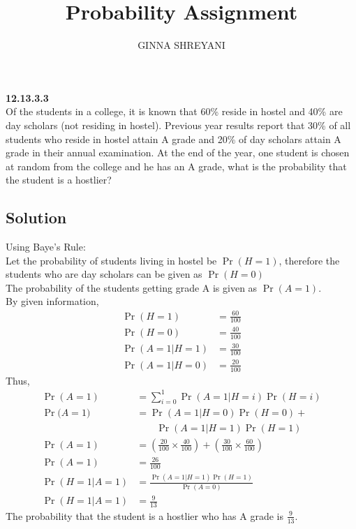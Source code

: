 \documentclass[10pt,twocolumn]{article}
\title{
Probability Assignment
}
\author{GINNA SHREYANI}
\date{}
\begin{document}
\maketitle

\textbf{12.13.3.3}\\
Of the students in a college, it is known that 60\% reside in hostel and 40\% are day scholars (not residing in hostel). Previous year results report that 30\% of all students who reside in hostel attain A grade and 20\% of day scholars attain A grade in their annual examination. At the end of the year, one student is chosen at random from the college and he has an A grade, what is the probability that the student is a hostlier?
\subsection*{Solution}
Using Baye's Rule:\\
Let the probability of students living in hostel be $\Pr(H=1)$, therefore the students who are day scholars can be given as $\Pr(H=0)$\\
The probability of the students getting grade A is given as $\Pr(A=1)$.\\
By given information,
\begin{align}
	\Pr(H=1) &= \frac{60}{100}\\
	\Pr(H=0) &= \frac{40}{100}\\
	\Pr(A=1|H=1) &= \frac{30}{100}\\
	\Pr(A=1|H=0) &= \frac{20}{100}
\end{align}
Thus,
\begin{align}
	\Pr(A=1) &= \sum_{i=0}^1 \Pr(A = 1|H = i)\Pr(H=i)\\
	\text{$\Pr(A=1$)}
	&=\Pr(A = 1|H = 0)\Pr(H = 0)+\\
	&\qquad \Pr(A = 1|H = 1)\Pr(H = 1)\\
	\Pr(A=1) &= \left(\frac{20}{100} \times \frac{40}{100}\right)+\left(\frac{30}{100} \times \frac{60}{100}\right)\\
	\Pr(A=1) &= \frac{26}{100}\\
	\Pr(H=1|A=1) &= \frac{\Pr(A=1|H=1)\Pr(H=1)}{\Pr(A=0)}\\
	\Pr(H=1|A=1) &= \frac{9}{13}
\end{align}
The probability that the student is a hostlier who has A grade is $\frac{9}{13}$.
\end{document}
